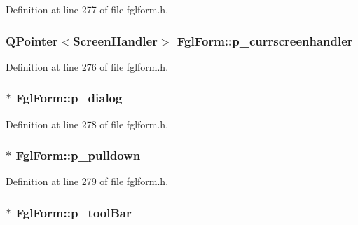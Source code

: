 Definition at line 277 of file fglform.h.

\hypertarget{classFglForm_a98e11b2d55100f907821e3a8281b4ab5}{
\subsubsection[{p\_\-currscreenhandler}]{\setlength{\rightskip}{0pt plus 5cm}QPointer$<$ScreenHandler$>$ {\bf FglForm::p\_\-currscreenhandler}}}
\label{classFglForm_a98e11b2d55100f907821e3a8281b4ab5}


Definition at line 276 of file fglform.h.

\hypertarget{classFglForm_afa28d86c6e353e3e31c677b463199a4a}{
\subsubsection[{p\_\-dialog}]{$\ast$ {\bf FglForm::p\_\-dialog}}}
\label{classFglForm_afa28d86c6e353e3e31c677b463199a4a}


Definition at line 278 of file fglform.h.

\hypertarget{classFglForm_a87a0ac69973f45c48fb629d04ac5b364}{
\subsubsection[{p\_\-pulldown}]{$\ast$ {\bf FglForm::p\_\-pulldown}}}
\label{classFglForm_a87a0ac69973f45c48fb629d04ac5b364}


Definition at line 279 of file fglform.h.

\hypertarget{classFglForm_a63ee680575b50bd02473649cd3d272f5}{
\subsubsection[{p\_\-toolBar}]{$\ast$ {\bf FglForm::p\_\-toolBar}}}
\label{classFglForm_a63ee680575b50bd02473649cd3d272f5}


